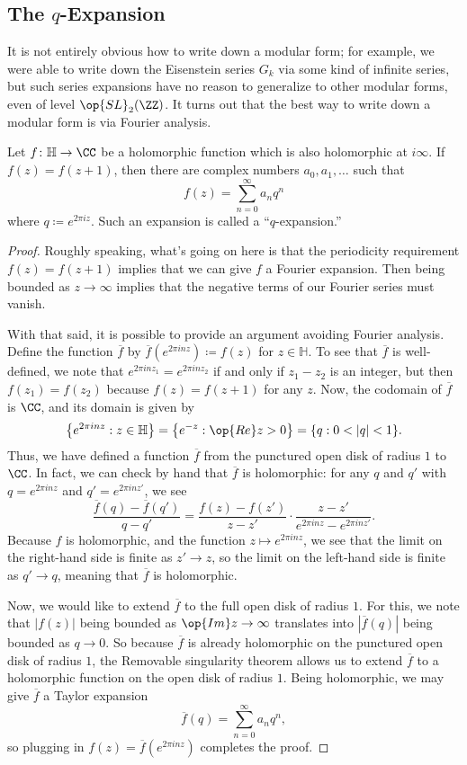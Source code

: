 \documentclass{amsart}
\begin{document}
\subsection{The \texorpdfstring{$q$}{q}-Expansion}
It is not entirely obvious how to write down a modular form; for example, we were able to write down the Eisenstein series $G_k$ via some kind of infinite series, but such series expansions have no reason to generalize to other modular forms, even of level $\op{SL}_2(\ZZ)$. It turns out that the best way to write down a modular form is via Fourier analysis.
\begin{proposition}[{$q$-expansion}] \label{prop:q-expansion}
	Let $f\colon\mathbb H\to\CC$ be a holomorphic function which is also holomorphic at $i\infty$. If $f(z)=f(z+1)$, then there are complex numbers $a_0,a_1,\ldots$ such that
	\[f(z)=\sum_{n=0}^\infty a_nq^n\]
	where $q\coloneqq e^{2\pi iz}$. Such an expansion is called a ``$q$-expansion.''
\end{proposition}
\begin{proof}
	Roughly speaking, what's going on here is that the periodicity requirement $f(z)=f(z+1)$ implies that we can give $f$ a Fourier expansion. Then being bounded as $z\to\infty$ implies that the negative terms of our Fourier series must vanish.

	With that said, it is possible to provide an argument avoiding Fourier analysis. Define the function $\overline f$ by $\overline f\left(e^{2\pi inz}\right)\coloneqq f(z)$ for $z\in\mathbb H$. To see that $\overline f$ is well-defined, we note that $e^{2\pi inz_1}=e^{2\pi inz_2}$ if and only if $z_1-z_2$ is an integer, but then $f(z_1)=f(z_2)$ because $f(z)=f(z+1)$ for any $z$. Now, the codomain of $\overline f$ is $\CC$, and its domain is given by
	\[\left\{e^{2\pi inz}:z\in\mathbb H\right\}=\left\{e^{-z}:\op{Re}z>0\right\}=\{q:0<|q|<1\}.\]
	Thus, we have defined a function $\overline f$ from the punctured open disk of radius $1$ to $\CC$. In fact, we can check by hand that $\overline f$ is holomorphic: for any $q$ and $q'$ with $q=e^{2\pi inz}$ and $q'=e^{2\pi inz'}$, we see
	\[\frac{\overline f(q)-\overline f(q')}{q-q'}=\frac{f(z)-f(z')}{z-z'}\cdot\frac{z-z'}{e^{2\pi inz}-e^{2\pi inz'}}.\]
	Because $f$ is holomorphic, and the function $z\mapsto e^{2\pi inz}$, we see that the limit on the right-hand side is finite as $z'\to z$, so the limit on the left-hand side is finite as $q'\to q$, meaning that $\overline f$ is holomorphic.

	Now, we would like to extend $\overline f$ to the full open disk of radius $1$. For this, we note that $|f(z)|$ being bounded as $\op{Im}z\to\infty$ translates into $|\overline f(q)|$ being bounded as $q\to0$. So because $\overline f$ is already holomorphic on the punctured open disk of radius $1$, the Removable singularity theorem allows us to extend $\overline f$ to a holomorphic function on the open disk of radius $1$. Being holomorphic, we may give $\overline f$ a Taylor expansion
	\[\overline f(q)=\sum_{n=0}^\infty a_nq^n,\]
	so plugging in $f(z)=\overline f\left(e^{2\pi inz}\right)$ completes the proof.
\end{proof}
\end{document}
